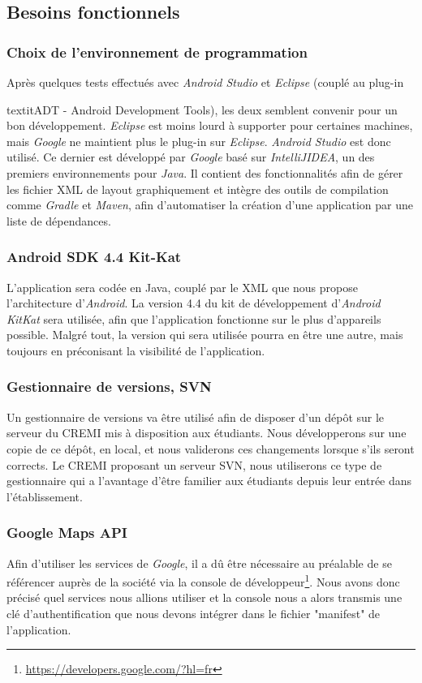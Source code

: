 \subsection{Besoins fonctionnels}

\subsubsection{Choix de l'environnement de programmation} Après quelques tests effectués avec \textit{Android Studio} et \textit{Eclipse} (couplé au plug-in {textit{ADT - Android Development Tools}), les deux semblent convenir pour un bon développement. \textit{Eclipse} est moins lourd à supporter pour certaines machines, mais \textit{Google} ne maintient plus le plug-in sur \textit{Eclipse}\cite{EclipseAndroid}. \textit{Android Studio} est donc utilisé. Ce dernier est développé par \textit{Google} basé sur \textit{IntelliJIDEA}, un des premiers environnements pour \textit{Java}. Il contient des fonctionnalités afin de gérer les fichier XML de layout graphiquement et intègre des outils de compilation comme \textit{Gradle} et \textit{Maven}, afin d'automatiser la création d'une application par une liste de dépendances.

\subsubsection{Android SDK 4.4 Kit-Kat} L'application sera codée en Java, couplé par le XML que nous propose l'architecture d'\textit{Android}. La version 4.4 du kit de développement d'\textit{Android KitKat} sera utilisée, afin que l'application fonctionne sur le plus d'appareils possible. Malgré tout, la version qui sera utilisée pourra en être une autre, mais toujours en préconisant la visibilité de l'application.

\subsubsection{Gestionnaire de versions, SVN} Un gestionnaire de versions va être utilisé afin de disposer d'un dépôt sur le serveur du CREMI mis à disposition aux étudiants. Nous développerons sur une copie de ce dépôt, en local, et nous validerons ces changements lorsque s'ils seront corrects. Le CREMI proposant un serveur SVN, nous utiliserons ce type de gestionnaire qui a l'avantage d'être familier aux étudiants depuis leur entrée dans l'établissement.

\subsubsection{Google Maps API } 
Afin d'utiliser les services de \textit{Google}, il a dû être nécessaire au préalable de se référencer auprès de la société via la console de développeur\footnote{\url{https://developers.google.com/?hl=fr}}. Nous avons donc précisé quel services nous allions utiliser et la console nous a alors transmis une clé d'authentification que nous devons intégrer dans le fichier "manifest" de l'application.
}
